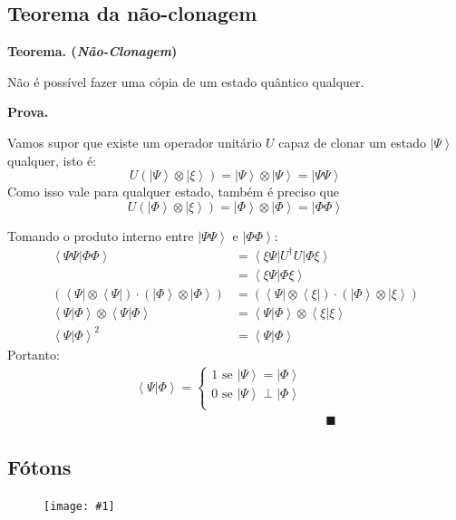 \documentclass[t]{beamer}
\newcommand{\teorema}[1]{%
	\textbf{Teorema. (\emph{#1})\\}
}
\newcommand{\prova}{%
	\textbf{Prova.\\}
}
\newcommand{\cqd}{\blacksquare}
\newcommand{\ket}[1]{\ensuremath{\left|#1\right\rangle}}
\newcommand{\bra}[1]{\ensuremath{\left\langle#1\right|}}
\newcommand{\braket}[2]{\ensuremath{\left\langle#1|#2\right\rangle}}
\newcommand{\imgw}[2]{%
\begin{center}
	\begin{figure}
	\texttt{[image: \#1]}\\
	\end{figure}
\end{center}
}
\begin{document}
	\subsection{Teorema da não-clonagem}
	
	
	\begin{frame}{\subsecname}
	
	\teorema{Não-Clonagem}
		Não é possível fazer uma cópia de um estado quântico qualquer.

	\prova
	Vamos supor que existe um operador unitário $U$ capaz de clonar um estado $\ket{\Psi}$ qualquer, isto é:
		$$U (\ket{\Psi} \otimes \ket{\xi}) = \ket{\Psi} \otimes \ket{\Psi} = \ket{\Psi\Psi}$$
	Como isso vale para qualquer estado, também é preciso que
		$$U (\ket{\Phi} \otimes \ket{\xi}) = \ket{\Phi} \otimes \ket{\Phi} = \ket{\Phi\Phi}$$
	\end{frame}
	
	\begin{frame}{\subsecname}
		Tomando o produto interno entre $\ket{\Psi\Psi}$ e $\ket{\Phi\Phi}$:
		\begin{align*}
		\braket{\Psi\Psi}{\Phi\Phi} &= \bra{\xi\Psi}U^{\dagger} U \ket{\Phi\xi}\\
		&= \braket{\xi\Psi}{\Phi\xi}\\
		(\bra{\Psi} \otimes \bra{\Psi}) \cdot (\ket{\Phi} \otimes \ket{\Phi}) &= (\bra{\Psi} \otimes \bra{\xi}) \cdot (\ket{\Phi} \otimes \ket{\xi})\\
		\braket{\Psi}{\Phi} \otimes \braket{\Psi}{\Phi} &= \braket{\Psi}{\Phi} \otimes \braket{\xi}{\xi}\\
		\braket{\Psi}{\Phi}^2 &= \braket{\Psi}{\Phi}
		\end{align*}
		Portanto:
		\begin{align*}
			\braket{\Psi}{\Phi} = \begin{cases}
			1 \text{ se } \ket{\Psi} = \ket{\Phi}\\
			0 \text{ se } \ket{\Psi} \perp \ket{\Phi}\\
			\end{cases}\\
		&& \cqd
		\end{align*}
	\end{frame}
	
	\subsection{Fótons}	
	
	\begin{frame}{\subsecname}
		\imgw{superposition.pdf}{\textwidth}
	\end{frame}
	
\end{document}
